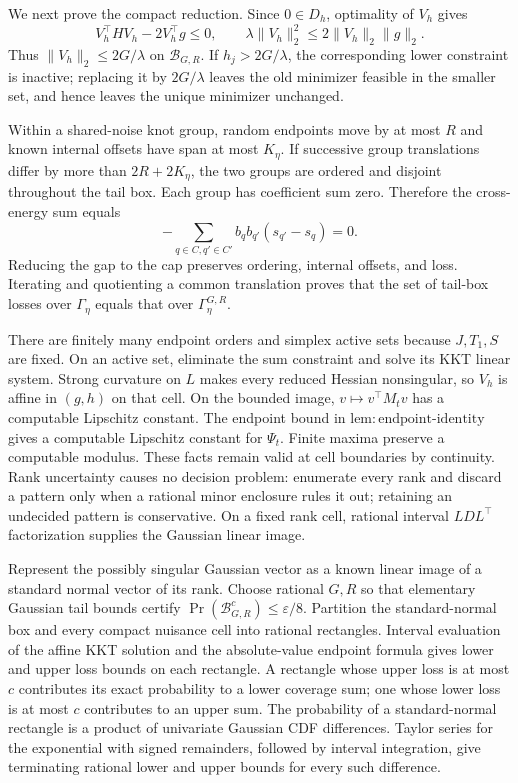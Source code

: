We next prove the compact reduction.  Since \(0\in D_h\), optimality of \(V_h\) gives
\[
 V_h^\top HV_h-2V_h^\top g\leq0,
 \qquad
 \lambda\|V_h\|_2^2\leq2\|V_h\|_2\|g\|_2.
\]
Thus \(\|V_h\|_2\leq2G/\lambda\) on \(\mathcal B_{G,R}\).  If
\(h_j>2G/\lambda\), the corresponding lower constraint is inactive; replacing it by \(2G/\lambda\) leaves the old minimizer feasible in the smaller set, and hence leaves the unique minimizer unchanged.

Within a shared-noise knot group, random endpoints move by at most \(R\) and known internal offsets have span at most \(K_\eta\).  If successive group translations differ by more than \(2R+2K_\eta\), the two groups are ordered and disjoint throughout the tail box.  Each group has coefficient sum zero.  Therefore the cross-energy sum equals
\[
 -\sum_{q\in C,q'\in C'}b_qb_{q'}(s_{q'}-s_q)=0.
\]
Reducing the gap to the cap preserves ordering, internal offsets, and loss.  Iterating and quotienting a common translation proves that the set of tail-box losses over \(\Gamma_\eta\) equals that over \(\Gamma_\eta^{G,R}\).

There are finitely many endpoint orders and simplex active sets because \(J,T_1,S\) are fixed.  On an active set, eliminate the sum constraint and solve its KKT linear system.  Strong curvature on \(L\) makes every reduced Hessian nonsingular, so \(V_h\) is affine in \((g,h)\) on that cell.  On the bounded image, \(v\mapsto v^\top M_tv\) has a computable Lipschitz constant.  The endpoint bound in \(\mathrm{lem:endpoint\mbox{-}identity}\) gives a computable Lipschitz constant for \(\Psi_t\).  Finite maxima preserve a computable modulus.  These facts remain valid at cell boundaries by continuity.  Rank uncertainty causes no decision problem: enumerate every rank and discard a pattern only when a rational minor enclosure rules it out; retaining an undecided pattern is conservative.  On a fixed rank cell, rational interval \(LDL^\top\) factorization supplies the Gaussian linear image.

Represent the possibly singular Gaussian vector as a known linear image of a standard normal vector of its rank.  Choose rational \(G,R\) so that elementary Gaussian tail bounds certify
\(\Pr(\mathcal B_{G,R}^c)\leq\varepsilon/8\).  Partition the standard-normal box and every compact nuisance cell into rational rectangles.  Interval evaluation of the affine KKT solution and the absolute-value endpoint formula gives lower and upper loss bounds on each rectangle.  A rectangle whose upper loss is at most \(c\) contributes its exact probability to a lower coverage sum; one whose lower loss is at most \(c\) contributes to an upper sum.  The probability of a standard-normal rectangle is a product of univariate Gaussian CDF differences.  Taylor series for the exponential with signed remainders, followed by interval integration, give terminating rational lower and upper bounds for every such difference.

